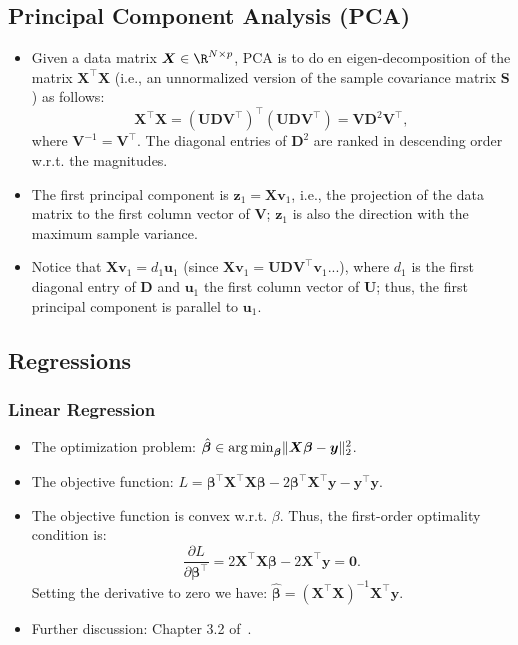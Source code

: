 \subsection{Principal Component Analysis (PCA)}
    \begin{itemize}
        \item Given a data matrix $\bm{X} \in \R^{\ndata \times \nfeat}$, PCA is to do en  eigen-decomposition of the matrix $\bm{X}^\top \bm{X}$ (i.e., an unnormalized version of the sample covariance matrix $\bm{S}$) as follows:
            \begin{equation}
                \bm{X}^\top \bm{X} = \left( \bm{U}\bm{D}\bm{V}^\top \right)^\top \left( \bm{U}\bm{D}\bm{V}^\top \right) = \bm{V} \bm{D}^2 \bm{V}^\top,
            \end{equation}
        where $\bm{V}^{-1} = \bm{V}^\top$. The diagonal entries of $\bm{D}^2$ are ranked in descending order w.r.t. the magnitudes.
        \item The first principal component is $\bm{z}_1 = \bm{X} \bm{v}_1$, i.e., the projection of the data matrix to the first column vector of $\bm{V}$; $\bm{z}_1$ is also the direction with the maximum sample variance.
        
        \item Notice that $\bm{X} \bm{v}_1 = d_1 \bm{u}_1$ (since $\bm{X} \bm{v}_1 = \bm{U} \bm{D} \bm{V}^\top \bm{v}_1$...), where $d_1$ is the first diagonal entry of $\bm{D}$ and $\bm{u}_1$ the first column vector of $\bm{U}$; thus, the first principal component is parallel to $\bm{u}_1$.
    \end{itemize}


\subsection{Regressions}
    \subsubsection{Linear Regression}\label{ML:linear-regression}
        \begin{itemize}
            \item The optimization problem: $\hat{\bm{\beta}} \in \operatorname{arg\,min}_{\bm{\beta}} \lVert\bm{X} \bm{\beta} - \bm{y}\rVert_2^2$.
            \item The objective function: $L = \bm{\beta}^\top \bm{X}^\top \bm{X} \bm{\beta} - 2 \bm{\beta}^\top \bm{X}^\top \bm{y} - \bm{y}^\top \bm{y}$.
            \item The objective function is convex w.r.t. $\beta$. Thus, the first-order optimality condition is: 
                \begin{equation}
                    \frac{\partial L}{\partial \bm{\beta}^\top} =  2 \bm{X}^\top \bm{X} \bm{\beta} - 2\bm{X}^\top \bm{y} = \bm{0}.
                \end{equation}
            Setting the derivative to zero we have: $\hat{\bm{\beta}} = (\bm{X}^\top \bm{X})^{-1} \bm{X}^\top \bm{y}$.
            \item Further discussion: Chapter 3.2 of~\cite{hastie2009elements}.
        \end{itemize}
    
